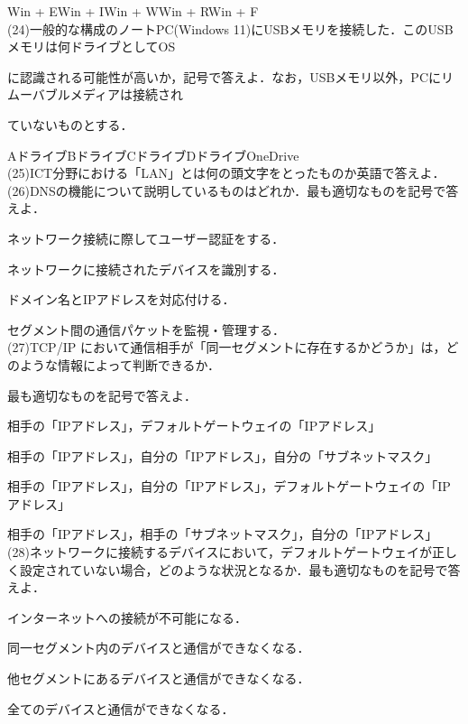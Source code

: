 Win + E\quad {}Win + I\quad {}Win + W\quad {}Win + R\quad {}Win + F\\
(24)一般的な構成のノートPC(Windows 11)にUSBメモリを接続した．このUSBメモリは何ドライブとしてOS\par\quad に認識される可能性が高いか，記号で答えよ．なお，USBメモリ以外，PCにリムーバブルメディアは接続され\par\quad ていないものとする．\par\quad
{}Aドライブ\quad {}Bドライブ\quad {}Cドライブ\quad {}Dドライブ\quad {}OneDrive\\
(25)ICT分野における「LAN」とは何の頭文字をとったものか英語で答えよ．\\
(26)DNSの機能について説明しているものはどれか．最も適切なものを記号で答えよ．\par\quad
{}ネットワーク接続に際してユーザー認証をする．\par\quad
{}ネットワークに接続されたデバイスを識別する．\par\quad
{}ドメイン名とIPアドレスを対応付ける．\par\quad
{}セグメント間の通信パケットを監視・管理する．\\
(27)TCP/IP において通信相手が「同一セグメントに存在するかどうか」は，どのような情報によって判断できるか．\par\quad 最も適切なものを記号で答えよ．\par\quad
{}相手の「IPアドレス」，デフォルトゲートウェイの「IPアドレス」\par\quad
{}相手の「IPアドレス」，自分の「IPアドレス」，自分の「サブネットマスク」\par\quad
{}相手の「IPアドレス」，自分の「IPアドレス」，デフォルトゲートウェイの「IPアドレス」\par\quad
{}相手の「IPアドレス」，相手の「サブネットマスク」，自分の「IPアドレス」\\
(28)ネットワークに接続するデバイスにおいて，デフォルトゲートウェイが正しく設定されていない場合，どのような状況となるか．最も適切なものを記号で答えよ．\par\quad
{}インターネットへの接続が不可能になる．\par\quad
{}同一セグメント内のデバイスと通信ができなくなる．\par\quad
{}他セグメントにあるデバイスと通信ができなくなる．\par\quad
{}全てのデバイスと通信ができなくなる．\\
